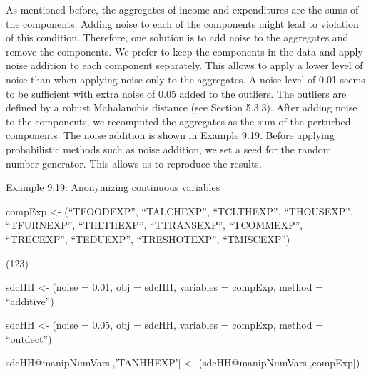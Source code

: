 \documentclass[letterpaper,10pt,english]{sphinxmanual}
\begin{document}
As mentioned before, the aggregates of income and expenditures are the
sums of the components. Adding noise to each of the components might
lead to violation of this condition. Therefore, one solution is to add
noise to the aggregates and remove the components. We prefer to keep the
components in the data and apply noise addition to each component
separately. This allows to apply a lower level of noise than when
applying noise only to the aggregates. A noise level of 0.01 seems to be
sufficient with extra noise of 0.05 added to the outliers. The outliers
are defined by a robust Mahalanobis distance (see Section 5.3.3). After
adding noise to the components, we recomputed the aggregates as the sum
of the perturbed components.  The noise addition is shown in Example 9.19. Before applying
probabilistic methods such as noise addition, we set a seed for the
random number generator. This allows us to reproduce the results.

Example 9.19: Anonymizing continuous variables


\begin{DUlineblock}{0em}
\item[] 
\item[] compExp \textless{}- (“TFOODEXP”, “TALCHEXP”, “TCLTHEXP”, “THOUSEXP”,
“TFURNEXP”, “THLTHEXP”, “TTRANSEXP”, “TCOMMEXP”, “TRECEXP”, “TEDUEXP”,
“TRESHOTEXP”, “TMISCEXP”)
\item[] (123)
\end{DUlineblock}


sdcHH \textless{}- (noise = 0.01, obj = sdcHH, variables = compExp,
method = “additive”)


sdcHH \textless{}- (noise = 0.05, obj = sdcHH, variables = compExp,
method = “outdect”)


sdcHH@manipNumVars{[},’TANHHEXP’{]} \textless{}-
(sdcHH@manipNumVars{[},compExp{]})
\end{document}
